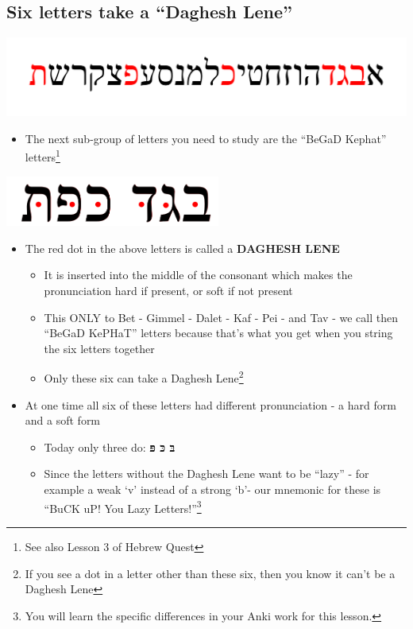 \documentclass[
]{turabian-researchpaper}
\providecommand{\tightlist}{%
  \setlength{\itemsep}{0pt}\setlength{\parskip}{0pt}}
\begin{document}
\hypertarget{one_4}{%
\subsection{Six letters take a ``Daghesh Lene''}\label{one_4}}

\begin{center}\includegraphics[width=500pt]{images/bgdkpt} \end{center}

\begin{itemize}
\tightlist
\item
  The next sub-group of letters you need to study are the ``BeGaD Kephat'' letters\footnote{See also Lesson 3 of Hebrew Quest}
\end{itemize}

\begin{center}\includegraphics[width=200pt]{images/bdgkpt_with_lene} \end{center}

\begin{itemize}
\tightlist
\item
  The red dot in the above letters is called a \textbf{DAGHESH LENE}

  \begin{itemize}
  \tightlist
  \item
    It is inserted into the middle of the consonant which makes the pronunciation hard if present, or soft if not present
  \item
    This ONLY to Bet - Gimmel - Dalet - Kaf - Pei - and Tav - we call then ``BeGaD KePHaT'' letters because that's what you get when you string the six letters together
  \item
    Only these six can take a Daghesh Lene\footnote{If you see a dot in a letter other than these six, then you know it can't be a Daghesh Lene}
  \end{itemize}
\item
  At one time all six of these letters had different pronunciation - a hard form and a soft form

  \begin{itemize}
  \tightlist
  \item
    Today only three do: \textbf{בּ כּ פּ}
  \item
    Since the letters without the Daghesh Lene want to be ``lazy'' - for example a weak `v' instead of a strong `b'- our mnemonic for these is ``BuCK uP! You Lazy Letters!''\footnote{You will learn the specific differences in your Anki work for this lesson.}
  \end{itemize}
\end{itemize}
\end{document}
